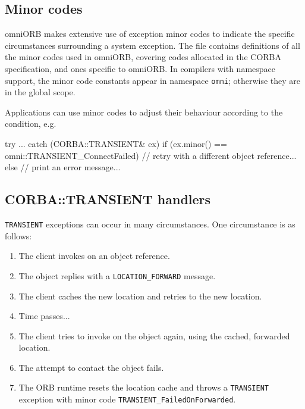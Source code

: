 \documentclass[11pt,oneside,a4paper]{book}
\newcommand{\code}[1]{\texttt{#1}}
\begin{document}
\subsection{Minor codes}

omniORB makes extensive use of exception minor codes to indicate the
specific circumstances surrounding a system exception.  The file
 contains definitions of all the
minor codes used in omniORB, covering codes allocated in the CORBA
specification, and ones specific to omniORB. In compilers with
namespace support, the minor code constants appear in namespace
\code{omni}; otherwise they are in the global scope.

Applications can use minor codes to adjust their behaviour according
to the condition, e.g.

\begin{cxxlisting}
try {
  ...
}
catch (CORBA::TRANSIENT& ex) {
  if (ex.minor() == omni::TRANSIENT_ConnectFailed) {
    // retry with a different object reference...
  }
  else {
    // print an error message...
  }
}
\end{cxxlisting}



\subsection{CORBA::TRANSIENT handlers}

\code{TRANSIENT} exceptions can occur in many circumstances. One
circumstance is as follows:

\begin{enumerate}

\item The client invokes on an object reference.
\item The object replies with a \code{LOCATION\_FORWARD} message.
\item The client caches the new location and retries to the new location.
\item Time passes...
\item The client tries to invoke on the object again, using the
      cached, forwarded location. 
\item The attempt to contact the object fails.
\item The ORB runtime resets the location cache and throws a
      \code{TRANSIENT} exception with minor code
      \code{TRANSIENT\_FailedOnForwarded}.

\end{enumerate}
\end{document}
